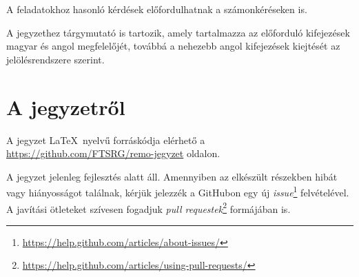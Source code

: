 \begin{tipp}
	A feladatokhoz hasonló kérdések előfordulhatnak a számonkéréseken is.
\end{tipp}

A jegyzethez tárgymutató is tartozik, amely tartalmazza az előforduló kifejezések magyar és angol megfelelőjét, továbbá a nehezebb angol kifejezések kiejtését az  jelölésrendszere szerint.

\section*{A jegyzetről}

A jegyzet \LaTeX\ nyelvű forráskódja elérhető a \url{https://github.com/FTSRG/remo-jegyzet} oldalon.

A jegyzet jelenleg fejlesztés alatt áll. Amennyiben az elkészült részekben hibát vagy hiányosságot találnak, kérjük jelezzék a GitHubon egy új \emph{issue}\footnote{\url{https://help.github.com/articles/about-issues/}} felvételével. A javítási ötleteket szívesen fogadjuk \emph{pull requestek}\footnote{\url{https://help.github.com/articles/using-pull-requests/}} formájában is.
